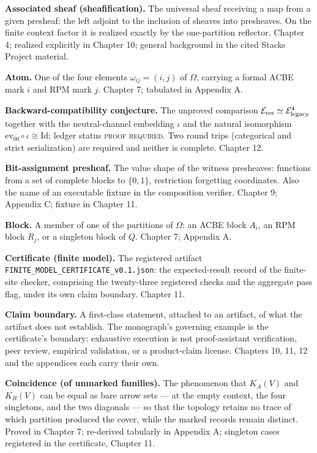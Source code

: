 \textbf{Associated sheaf (sheafification).} The universal sheaf
receiving a map from a given presheaf: the left adjoint to the
inclusion of sheaves into presheaves. On the finite context factor it
is realized exactly by the one-partition reflector. Chapter 4;
realized explicitly in Chapter 10; general background in the cited
Stacks Project material.

\textbf{Atom.} One of the four elements
$\omega_{ij} = (i, j)$ of $\Omega$, carrying a formal ACBE mark $i$
and RPM mark $j$. Chapter 7; tabulated in Appendix A.

\textbf{Backward-compatibility conjecture.} The unproved comparison
$\mathcal{E}_{\mathrm{res}} \simeq \mathcal{E}_{\mathrm{legacy}}^4$ together with the neutral-channel embedding
$\iota$ and the natural isomorphism
$\mathrm{ev}_{00} \circ \iota \cong \mathrm{Id}$; ledger status
\textsc{proof required}. Two round trips (categorical and strict
serialization) are required and neither is complete. Chapter 12.

\textbf{Bit-assignment presheaf.} The value shape of the witness
presheaves: functions from a set of complete blocks to $\{0, 1\}$,
restriction forgetting coordinates. Also the name of an executable
fixture in the composition verifier. Chapter 9; Appendix C; fixture in
Chapter 11.

\textbf{Block.} A member of one of the partitions of $\Omega$: an
ACBE block $A_i$, an RPM block $R_j$, or a singleton block of $Q$.
Chapter 7; Appendix A.

\textbf{Certificate (finite model).} The registered artifact
\texttt{FINITE\_MODEL\_CERTIFICATE\_v0.1.json}: the expected-result
record of the finite-site checker, comprising the twenty-three
registered checks and the aggregate pass flag, under its own claim
boundary. Chapter 11.

\textbf{Claim boundary.} A first-class statement, attached to an
artifact, of what the artifact does not establish. The monograph's
governing example is the certificate's boundary: exhaustive execution
is not proof-assistant verification, peer review, empirical
validation, or a product-claim license. Chapters 10, 11, 12 and the
appendices each carry their own.

\textbf{Coincidence (of unmarked families).} The phenomenon that
$K_A(V)$ and $K_R(V)$ can be equal as bare arrow sets --- at the empty
context, the four singletons, and the two diagonals --- so that the
topology retains no trace of which partition produced the cover, while
the marked records remain distinct. Proved in Chapter 7; re-derived
tabularly in Appendix A; singleton cases registered in the
certificate, Chapter 11.

